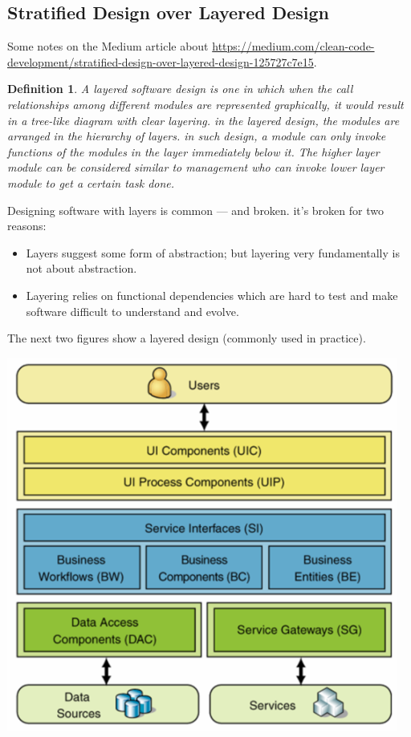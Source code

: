 \documentclass[a4paper,twoside]{article}
\newtheorem{definition}[theorem]{Definition}
\numberwithin{equation}{section}
\begin{document}
\subsection{Stratified Design over Layered Design}
Some notes on the Medium article about \href{Stratified Design}{https://medium.com/clean-code-development/stratified-design-over-layered-design-125727c7e15}.
\begin{definition}
    A layered software design is one in which when the call relationships among different modules are
    represented graphically, it would result in a tree-like diagram with clear layering. in the
    layered design, the modules are arranged in the hierarchy of layers. in such design, a module can only invoke functions of the modules in the layer immediately below it. The higher layer module can be considered similar to management who can invoke lower layer module to get a certain task done.
\end{definition}
Designing software with layers is common — and broken. it's broken for two reasons:
\begin{itemize}
    \item Layers suggest some form of abstraction; but layering very fundamentally is not about
          abstraction.
    \item Layering relies on functional dependencies which are hard to test and make software
          difficult to understand and evolve.
\end{itemize}
The next two figures show a layered design (commonly used in practice).
\begin{center}
    \includegraphics[scale = 0.3]{assets/layered_design.png}
\end{center}
\end{document}
